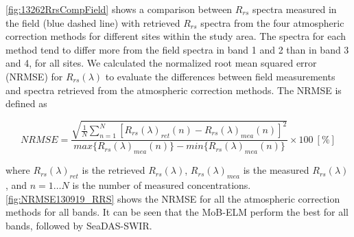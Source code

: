 \autoref{fig:13262RrsCompField} shows a comparison between $R_{rs}$ spectra measured in the field (blue dashed line) with retrieved $R_{rs}$ spectra from the four atmospheric correction methods for different sites within the study area. The spectra for each method tend to differ more from the field spectra in band 1 and 2 than in band 3 and 4, for all sites. We calculated the normalized root mean squared error (NRMSE) for $R_{rs}(\lambda)$ to evaluate the differences between field measurements and spectra retrieved from the atmospheric correction methods. The NRMSE is defined as

\begin{equation}
\label{eq:NRMSE}
  NRMSE =\frac{\sqrt{\frac{1}{N}\sum_{n=1}^N{\left[R_{rs}(\lambda)_{ret}(n) - R_{rs}(\lambda)_{mea}(n)\right]^2}}}{max\{R_{rs}(\lambda)_{mea}(n)\} - min\{R_{rs}(\lambda)_{mea}(n)\}}\times100 ~[\%]
\end{equation}

\noindent where $R_{rs}(\lambda)_{ret}$ is the retrieved $R_{rs}(\lambda)$, $R_{rs}(\lambda)_{mea}$ is the measured $R_{rs}(\lambda)$, and $n=1\dots N$ is the number of measured concentrations. \autoref{fig:NRMSE130919_RRS} shows the NRMSE for all the atmospheric correction methods for all bands. It can be seen that the MoB-ELM perform the best for all bands, followed by SeaDAS-SWIR. 




